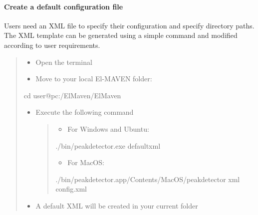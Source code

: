 \documentclass[letterpaper,10pt,english,openany,oneside]{sphinxmanual}
\begin{document}
\paragraph{Create a default configuration file}
\label{\detokenize{IntroductiontoElMAVENCLI:create-a-default-configuration-file}}
Users need an XML file to specify their configuration and specify directory paths. The XML template can be generated using a simple command and modified according to user requirements.
\begin{quote}
\begin{itemize}
\item {} 
Open the terminal

\item {} 
Move to your local El-MAVEN folder:

\end{itemize}

%
\begin{sphinxVerbatim}[commandchars=\\\{\}]
\PYGZdl{} cd user@pc:\PYGZti{}/ElMaven/ElMaven
\end{sphinxVerbatim}
\begin{itemize}
\item {} 
Execute the following command
\begin{quote}
\begin{itemize}
\item {} 
For Windows and Ubuntu:

\end{itemize}

%
\begin{sphinxVerbatim}[commandchars=\\\{\}]
\PYGZdl{} ./bin/peakdetector.exe \PYGZhy{}\PYGZhy{}defaultxml
\end{sphinxVerbatim}
\begin{itemize}
\item {} 
For MacOS:

\end{itemize}

%
\begin{sphinxVerbatim}[commandchars=\\\{\}]
\PYGZdl{} ./bin/peakdetector.app/Contents/MacOS/peakdetector \PYGZhy{}\PYGZhy{}xml config.xml
\end{sphinxVerbatim}
\end{quote}

\item {} 
A default XML will be created in your current folder

\end{itemize}
\end{quote}
\end{document}
